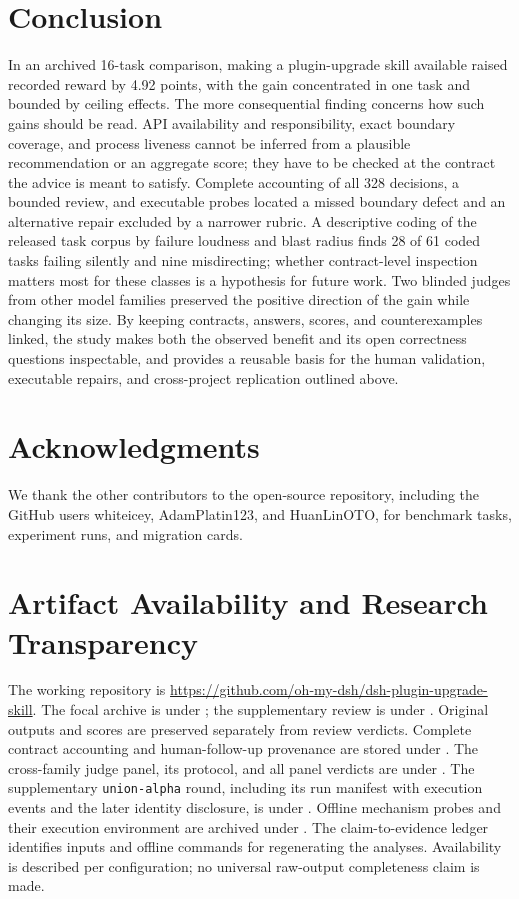 \documentclass[11pt]{article}
\begin{document}
\section{Conclusion}
In an archived 16-task comparison, making a plugin-upgrade skill available raised recorded reward by 4.92 points, with the gain concentrated in one task and bounded by ceiling effects. The more consequential finding concerns how such gains should be read. API availability and responsibility, exact boundary coverage, and process liveness cannot be inferred from a plausible recommendation or an aggregate score; they have to be checked at the contract the advice is meant to satisfy. Complete accounting of all 328 decisions, a bounded review, and executable probes located a missed boundary defect and an alternative repair excluded by a narrower rubric. A descriptive coding of the released task corpus by failure loudness and blast radius finds 28 of 61 coded tasks failing silently and nine misdirecting; whether contract-level inspection matters most for these classes is a hypothesis for future work. Two blinded judges from other model families preserved the positive direction of the gain while changing its size. By keeping contracts, answers, scores, and counterexamples linked, the study makes both the observed benefit and its open correctness questions inspectable, and provides a reusable basis for the human validation, executable repairs, and cross-project replication outlined above.

\section*{Acknowledgments}
We thank the other contributors to the open-source repository, including the GitHub users whiteicey, AdamPlatin123, and HuanLinOTO, for benchmark tasks, experiment runs, and migration cards.

\section*{Artifact Availability and Research Transparency}
The working repository is \url{https://github.com/oh-my-dsh/dsh-plugin-upgrade-skill}. The focal archive is under ; the supplementary review is under . Original outputs and scores are preserved separately from review verdicts. Complete contract accounting and human-follow-up provenance are stored under . The cross-family judge panel, its protocol, and all panel verdicts are under . The supplementary \texttt{union-alpha} round, including its run manifest with execution events and the later identity disclosure, is under . Offline mechanism probes and their execution environment are archived under . The claim-to-evidence ledger identifies inputs and offline commands for regenerating the analyses. Availability is described per configuration; no universal raw-output completeness claim is made.
\end{document}
